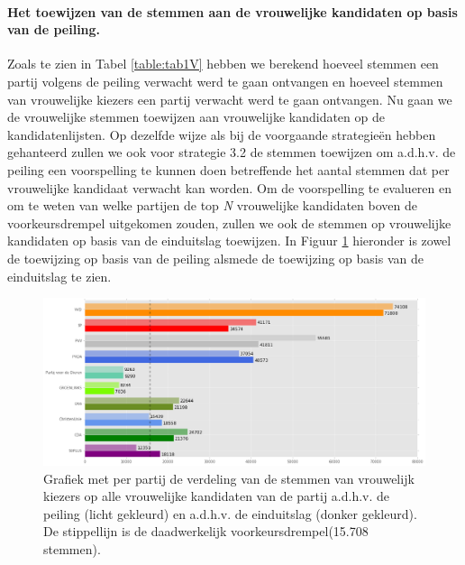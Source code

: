 \paragraph{Het toewijzen van de stemmen aan de vrouwelijke kandidaten op basis van de peiling.}
Zoals te zien in Tabel \ref{table:tab1V} hebben we berekend hoeveel stemmen een partij volgens de peiling verwacht werd te gaan ontvangen en hoeveel stemmen van vrouwelijke kiezers een partij verwacht werd te gaan ontvangen. Nu gaan we de vrouwelijke stemmen toewijzen aan vrouwelijke kandidaten op de kandidatenlijsten. Op dezelfde wijze als bij de voorgaande strategie\"{e}n hebben gehanteerd zullen we ook voor strategie 3.2 de stemmen toewijzen om a.d.h.v. de peiling een  voorspelling te kunnen doen betreffende het aantal stemmen dat per vrouwelijke kandidaat verwacht kan worden. Om de voorspelling te evalueren en om te weten van welke partijen de top \textit{N} vrouwelijke kandidaten boven de voorkeursdrempel uitgekomen zouden, zullen we ook de stemmen op vrouwelijke kandidaten op basis van de einduitslag toewijzen. In Figuur \ref{fig:stemmenS32V}  hieronder is zowel de toewijzing op basis van de peiling alsmede de toewijzing op basis van de einduitslag te zien.  




\begin{figure}[H]

	\includegraphics[width=\linewidth]{stemmen_op_vrouwen_eigenX_samen.png}

			\caption{Grafiek met per partij de verdeling van de stemmen van vrouwelijk kiezers op alle vrouwelijke kandidaten van de partij a.d.h.v. de peiling (licht gekleurd) en a.d.h.v. de einduitslag (donker gekleurd). De stippellijn is de daadwerkelijk voorkeursdrempel(15.708 stemmen).}

\label{fig:stemmenS32V}
\end{figure}


